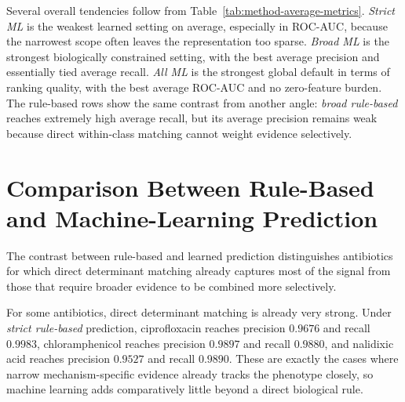 Several overall tendencies follow from Table~\ref{tab:method-average-metrics}. \textit{Strict ML} is the weakest learned setting on average, especially in ROC-AUC, because the narrowest scope often leaves the representation too sparse. \textit{Broad ML} is the strongest biologically constrained setting, with the best average precision and essentially tied average recall. \textit{All ML} is the strongest global default in terms of ranking quality, with the best average ROC-AUC and no zero-feature burden. The rule-based rows show the same contrast from another angle: \textit{broad rule-based} reaches extremely high average recall, but its average precision remains weak because direct within-class matching cannot weight evidence selectively.

\section{Comparison Between Rule-Based and Machine-Learning Prediction}

The contrast between rule-based and learned prediction distinguishes antibiotics for which direct determinant matching already captures most of the signal from those that require broader evidence to be combined more selectively.

For some antibiotics, direct determinant matching is already very strong. Under \textit{strict rule-based} prediction, ciprofloxacin reaches precision \(0.9676\) and recall \(0.9983\), chloramphenicol reaches precision \(0.9897\) and recall \(0.9880\), and nalidixic acid reaches precision \(0.9527\) and recall \(0.9890\). These are exactly the cases where narrow mechanism-specific evidence already tracks the phenotype closely, so machine learning adds comparatively little beyond a direct biological rule.

